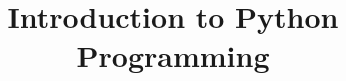 \documentclass[xcolor=dvipsnames,compress,t,pdf]{beamer}
\title[\insertframenumber /\inserttotalframenumber]{Introduction to Python Programming}
\begin{document}
	\begin{frame}
	\titlepage
	\end{frame}
	
	
\end{document}
